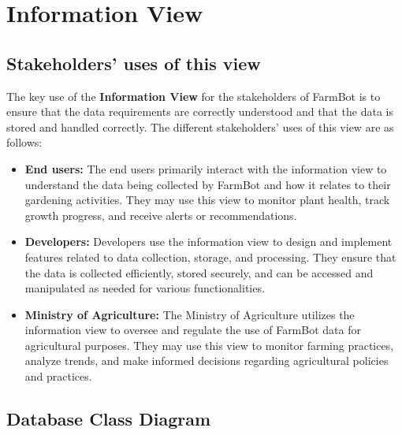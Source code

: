 \section{Information View}

\subsection{Stakeholders’ uses of this view}

The key use of the \textbf{Information View} for the stakeholders of FarmBot is to ensure that the data requirements are correctly understood and that the data is stored and handled correctly. The different stakeholders' uses of this view are as follows:
\begin{itemize}
    \item \textbf{End users:} The end users primarily interact with the information view to understand the data being collected by FarmBot and how it relates to their gardening activities. They may use this view to monitor plant health, track growth progress, and receive alerts or recommendations.
    \item \textbf{Developers:} Developers use the information view to design and implement features related to data collection, storage, and processing. They ensure that the data is collected efficiently, stored securely, and can be accessed and manipulated as needed for various functionalities.
    \item \textbf{Ministry of Agriculture:} The Ministry of Agriculture utilizes the information view to oversee and regulate the use of FarmBot data for agricultural purposes. They may use this view to monitor farming practices, analyze trends, and make informed decisions regarding agricultural policies and practices.
\end{itemize}

\subsection{Database Class Diagram}

